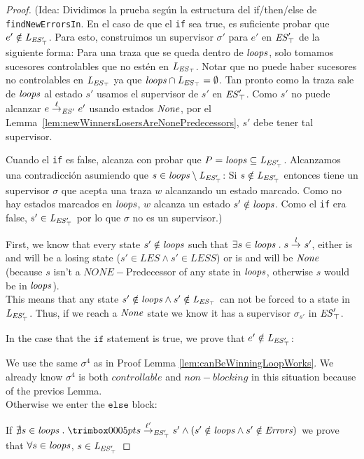 \begin{proof}
	(Idea: Dividimos la prueba según la estructura del  if/then/else de \texttt{findNewErrorsIn}. 
	En el caso de que el \texttt{if} sea true, es suficiente probar que $e' \notin \mathit{L_{\mathit{\mathit{ES}'_{\top}}}}$. Para esto, 
	construimos un supervisor $\sigma'$ para $e'$ en $\mathit{\mathit{ES}'_{\top}}$ de la siguiente forma: Para una traza que se queda dentro de $\mathit{loops}$, solo tomamos sucesores controlables que no estén en $\mathit{L_{\mathit{\mathit{ES}_{\top}}}}$. Notar que no puede haber sucesores no controlables en $\mathit{L_{\mathit{\mathit{ES}_{\top}}}}$ ya que
	$\mathit{loops} \cap \mathit{L_{\mathit{\mathit{ES}_{\top}}}}= \emptyset$. Tan pronto como la traza sale de $\mathit{loops}$ al estado $s'$ usamos el supervisor de $s'$ en $\mathit{\mathit{ES}'_{\top}}$. 
	Como $s'$ no puede alcanzar $e \overset{\ell}{\rightarrow}_{\mathit{ES}'} 
	e'$ usando estados $\mathit{None}$, por el 
	Lemma~\ref{lem:newWinnersLosersAreNonePredecessors}, $s'$ debe tener tal supervisor. 
	
	Cuando el \texttt{if} es false, alcanza con probar que $P = \mathit{loops} \subseteq \mathit{L_{\mathit{\mathit{ES}'_{\top}}}}$. Alcanzamos una contradicción asumiendo que $s \in \mathit{loops} \setminus \mathit{L_{\mathit{\mathit{ES}'_{\top}}}}$: Si $s 
	\notin \mathit{L_{\mathit{\mathit{ES}'_{\top}}}}$ entonces tiene un supervisor $\sigma$ que acepta una traza $w$ alcanzando un estado marcado. Como no hay estados marcados en $\mathit{loops}$, $w$ alcanza un estado $s' \notin \mathit{loops}$. Como el
	\texttt{if} era false, $s' \in \mathit{L_{\mathit{\mathit{ES}'_{\top}}}}$ por lo que $\sigma$ no es un supervisor.)


First, we know that every state $s' \notin \mathit{loops}$ such that $\exists s \in \mathit{loops} \;.\; s 
\overset{l}{\rightarrow}_{} s'$, either is and will be a losing state ($s' \in LES \wedge s' \in LESS$) or is 
and will be $\mathit{None}$ (because $s$ isn't a $NONE-$Predecessor of any state in 
$\mathit{loops}$, otherwise $s$ would be in $\mathit{loops}$). \\
This means that any state $s' \notin \mathit{loops} \wedge s' \notin \mathit{L_{\mathit{\mathit{ES}_{\top}}}}$ can not be forced to a state in $\mathit{L_{\mathit{\mathit{ES}'_{\top}}}}$. Thus, if we reach a $\mathit{None}$ state we know it has a supervisor $\sigma_{s'}$ in $\mathit{\mathit{ES}'_{\top}}$.

In the case that the $\texttt{if}$ statement is true, we prove that $e' \notin \mathit{L_{\mathit{\mathit{ES}'_{\top}}}}$:

We use the same $\sigma^4$ as in Proof Lemma \ref{lem:canBeWinningLoopWorks}. We already know $\sigma^4$ is both $controllable$ and $non-blocking$ in this situation because of the previos Lemma.\\

Otherwise we enter the $\texttt{else}$ block:

If $\nexists s \in \SCC \ldot \trimlst{s \step{\l'}{\unexploredToTop{\structure'}}  s'} \wedge (s' \notin \SCC \wedge s' \notin \Errors)$ we prove that $\forall s \in \mathit{loops}$, $s \in \mathit{L_{\mathit{\mathit{ES}'_{\top}}}}$


\end{proof}
